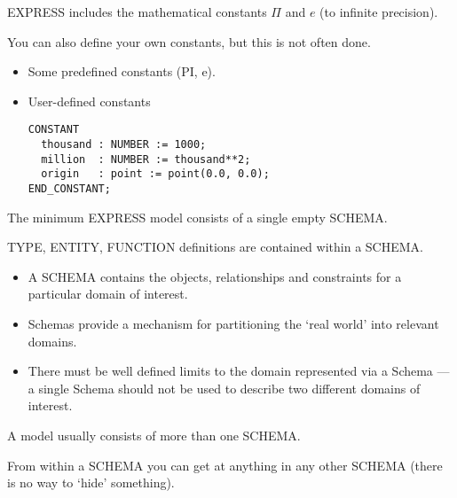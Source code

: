\begin{remarks}
\remintro
{}

EXPRESS includes the mathematical constants $\Pi$ and $e$ (to infinite
precision).

You can also define your own constants, but this is not often done.

\remend
\end{remarks}


\begin{itemize}
\item Some predefined constants (PI, e).
\item User-defined constants
\begin{verbatim}
CONSTANT
  thousand : NUMBER := 1000;
  million  : NUMBER := thousand**2;
  origin   : point := point(0.0, 0.0);
END_CONSTANT;
\end{verbatim}
\end{itemize}


\begin{remarks}
\remintro
{}

The minimum EXPRESS model consists of a single empty SCHEMA.

TYPE, ENTITY, FUNCTION definitions are contained within a SCHEMA.

\remend
\end{remarks}


\begin{itemize}
\item A SCHEMA contains the objects, relationships and constraints for a
particular domain of interest.
\item Schemas provide a mechanism for partitioning the `real world' into
      relevant domains. 
\item There must be well defined limits to the domain represented via a Schema
      --- a single Schema should not be used to describe two different
      domains of interest.
\end{itemize}


\begin{remarks}
\remintro
{}

A model usually consists of more than one SCHEMA.

From within a SCHEMA you can get at anything in any other SCHEMA
(there is no way to `hide' something).

\remend
\end{remarks}

